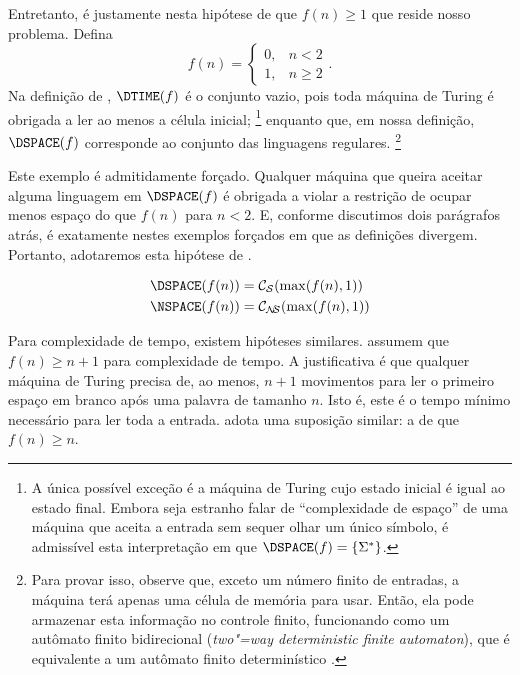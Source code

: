 Entretanto, é justamente nesta hipótese de que $f(n) \geq 1$
que reside nosso problema. Defina
\begin{equation*}
    f(n) = \begin{cases}
        0, & n < 2 \\
        1, & n \geq 2
    \end{cases}.
\end{equation*}
Na definição de ,
$\DTIME(f)$ é o conjunto vazio,
pois toda máquina de Turing
é obrigada a ler ao menos a célula inicial;%
\footnote{
    A única possível exceção
    é a máquina de Turing
    cujo estado inicial é igual ao estado final.
    Embora seja estranho falar de ``complexidade de espaço''
    de uma máquina que aceita a entrada sem sequer olhar um único símbolo,
    é admissível esta interpretação em que
    $\DSPACE(f) = \{\Sigma^*\}$.
}
enquanto que, em nossa definição,
$\DSPACE(f)$ corresponde ao conjunto das linguagens regulares.%
\footnote{
    Para provar isso, observe que,
    exceto um número finito de entradas,
    a máquina terá apenas uma célula de memória para usar.
    Então, ela pode armazenar esta informação no controle finito,
    funcionando como um autômato finito bidirecional
    (\emph{two"=way deterministic finite automaton}),
    que é equivalente a um autômato finito determinístico
    \cite[p.~40]{HopcroftUllman1979}.
}

Este exemplo é admitidamente forçado.
Qualquer máquina que queira aceitar alguma linguagem em $\DSPACE(f)$
é obrigada a violar a restrição de
ocupar menos espaço do que $f(n)$
para $n < 2$.
E, conforme discutimos dois parágrafos atrás,
é exatamente nestes exemplos forçados
em que as definições divergem.
Portanto, adotaremos esta hipótese de
.

\begin{definition}
    \begin{align*}
        \DSPACE(f(n)) &= \mathcal C_\PhiDS(\max(f(n), 1)) \\
        \NSPACE(f(n)) &= \mathcal C_\PhiNS(\max(f(n), 1))
    \end{align*}
\end{definition}

Para complexidade de tempo,
existem hipóteses similares.
assumem que $f(n) \geq n+1$
para complexidade de tempo.
A justificativa é que
qualquer máquina de Turing precisa de,
ao menos,
$n+1$ movimentos para ler o primeiro espaço em branco
após uma palavra de tamanho $n$.
Isto é,
este é o tempo mínimo necessário
para ler toda a entrada.
adota uma suposição similar:
a de que $f(n) \geq n$.

